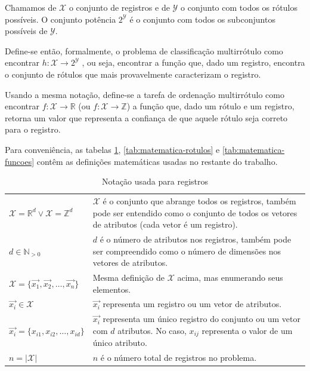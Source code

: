 \documentclass[runningheads,a4paper]{llncs}
\begin{document}
Chamamos de $\mathcal{X}$ o conjunto de registros e de $\mathcal{Y}$ o conjunto com todos os rótulos possíveis. O conjunto potência $2^{\mathcal{Y}}$ é o conjunto com todos os subconjuntos possíveis de $\mathcal{Y}$.

Define-se então, formalmente, o problema de classificação multirrótulo como encontrar $h : \mathcal{X} \to 2^\mathcal{Y}$ , ou seja, encontrar a função que, dado um registro, encontra o conjunto de rótulos que mais provavelmente caracterizam o registro.

Usando a mesma notação, define-se a tarefa de ordenação multirrótulo como encontrar $f : \mathcal{X} \to \mathbb{R}$ (ou $f : \mathcal{X} \to \mathbb{Z}$) a função que, dado um rótulo e um registro, retorna um valor que representa a confiança de que aquele rótulo seja correto para o registro.

Para conveniência, as tabelas \ref{tab:matematica-registros}, \ref{tab:matematica-rotulos} e \ref{tab:matematica-funcoes} contêm as definições matemáticas usadas no restante do trabalho.

\begin{table}
	\centering
	\begin{tabular}{| >{\centering}p{4cm} | m{8cm} |}
		\hline
		\multicolumn{2}{|c|}{\textit{Registros ou vetores de atributos}} \\
		\hline
		$\mathcal{X} = \mathbb{R}^d \vee \mathcal{X} = \mathbb{Z}^d$ & $\mathcal{X}$ é o conjunto que abrange todos os registros, também pode ser entendido como o conjunto de todos os vetores de atributos (cada vetor é um registro). \\
		\hline
		$d \in \mathbb{N}_{>0}$ & $d$ é o número de atributos nos registros, também pode ser compreendido como o número de dimensões nos vetores de atributos. \\
		\hline
		$\mathcal{X} = \{\vec{x_1}, \vec{x_2}, \dots, \vec{x_n}\}$ & Mesma definição de $\mathcal{X}$ acima, mas enumerando seus elementos. \\
		\hline
		$\vec{x_i} \in \mathcal{X}$ & $\vec{x_i}$ representa um registro ou um vetor de atributos. \\
		\hline
		$\vec{x_i} = \{x_{i1}, x_{i2}, \dots, x_{id}\}$ & $\vec{x_i}$ representa um único registro do conjunto ou um vetor com $d$ atributos. No caso, $x_{ij}$ representa o valor de um único atributo. \\
		\hline
		$n = |\mathcal{X}|$ & $n$ é o número total de registros no problema. \\
		\hline
	\end{tabular}
	\caption{Notação usada para registros}
	\label{tab:matematica-registros}
\end{table}
\end{document}
